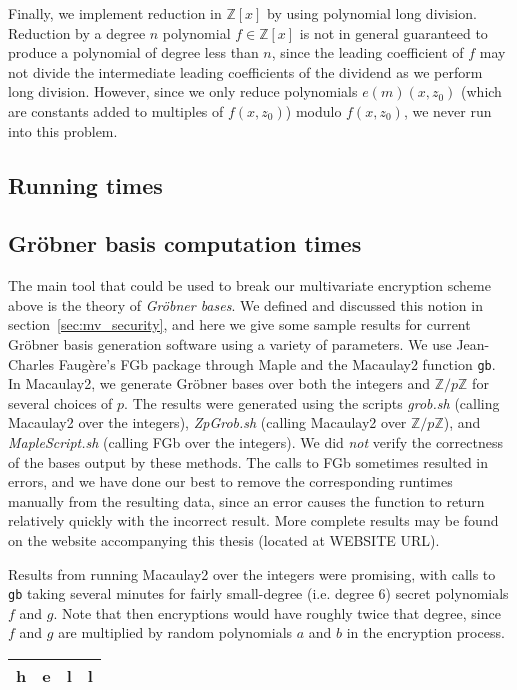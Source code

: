\documentclass[11pt]{report}
\newcommand{\Zp}{\mathbb{Z}/p\mathbb{Z}}
\newcommand{\Zx}{\mathbb{Z}[x]}
\begin{document}
Finally, we implement reduction in $\Zx$ by using polynomial long division. Reduction by a degree $n$ polynomial $f\in\Zx$ is not in general guaranteed to produce a polynomial of degree less than $n$, since the leading coefficient of $f$ may not divide the intermediate leading coefficients of the dividend as we perform long division. However, since we only reduce polynomials $e(m)(x,z_0)$ (which are constants added to multiples of $f(x,z_0)$) modulo $f(x,z_0)$, we never run into this problem.

\subsection{Running times}


\subsection{Gr\"obner basis computation times}
The main tool that could be used to break our multivariate encryption scheme above is the theory of \emph{Gr\"obner bases}. We defined and discussed this notion in section~\ref{sec:mv_security}, and here we give some sample results for current Gr\"obner basis generation software using a variety of parameters. We use Jean-Charles Faug\`ere's FGb package through Maple and the Macaulay2 function \verb|gb|. In Macaulay2, we generate Gr\"obner bases over both the integers and $\Zp$ for several choices of $p$. The results were generated using the scripts \emph{grob.sh} (calling Macaulay2 over the integers), \emph{ZpGrob.sh} (calling Macaulay2 over $\Zp$), and \emph{MapleScript.sh} (calling FGb over the integers). We did \emph{not} verify the correctness of the bases output by these methods. The calls to FGb sometimes resulted in errors, and we have done our best to remove the corresponding runtimes manually from the resulting data, since an error causes the function to return relatively quickly with the incorrect result. More complete results may be found on the website accompanying this thesis (located at WEBSITE URL).

Results from running Macaulay2 over the integers were promising, with calls to \verb|gb| taking several minutes for fairly small-degree (i.e. degree 6) secret polynomials $f$ and $g$. Note that then encryptions would have roughly twice that degree, since $f$ and $g$ are multiplied by random polynomials $a$ and $b$ in the encryption process.

\begin{center}
\begin{tabular}{| l | l | l | l |}
\hline
h & e & l & l \\
\hline
\end{tabular}
\end{center}
\end{document}
